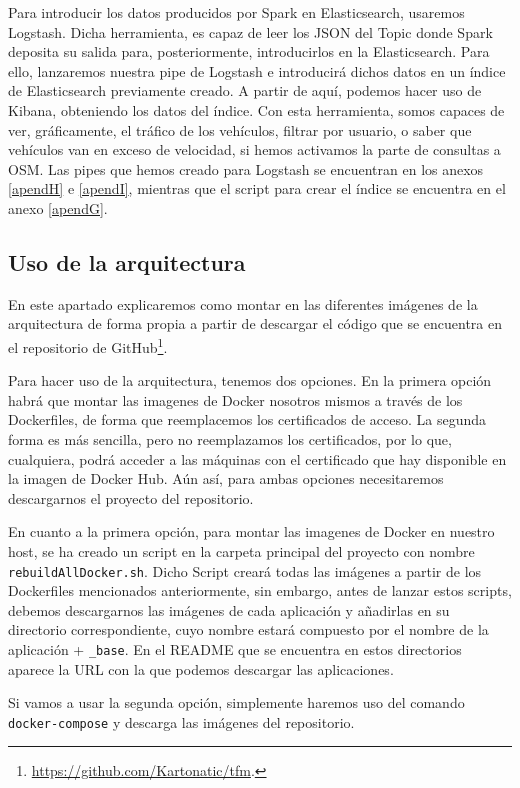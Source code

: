 Para introducir los datos producidos por Spark en Elasticsearch, usaremos Logstash. Dicha herramienta, es capaz de leer los JSON del Topic donde Spark deposita su salida para, posteriormente, introducirlos en la Elasticsearch. Para ello, lanzaremos nuestra pipe de Logstash e introducirá dichos datos en un índice de Elasticsearch previamente creado. A partir de aquí, podemos hacer uso de Kibana, obteniendo los datos del índice. Con esta herramienta, somos capaces de ver, gráficamente, el tráfico de los vehículos, filtrar por usuario, o saber que vehículos van en exceso de velocidad, si hemos activamos la parte de consultas a OSM. Las pipes que hemos creado para Logstash se encuentran en los anexos \ref{apendH} e \ref{apendI}, mientras que el script para crear el índice se encuentra en el anexo \ref{apendG}.

\subsection{Uso de la arquitectura \label{uso}}

En este apartado explicaremos como montar en las diferentes imágenes de la
arquitectura de forma propia a partir de descargar el código que se
encuentra en el repositorio de
GitHub\footnote{\url{https://github.com/Kartonatic/tfm}.}.

Para hacer uso de la arquitectura, tenemos dos opciones. En la primera opción habrá que montar las imagenes de Docker nosotros mismos a través de los Dockerfiles, de forma que reemplacemos los certificados de acceso. La segunda forma es más sencilla, pero no reemplazamos los certificados, por lo que, cualquiera, podrá acceder a las máquinas con el certificado que hay disponible en la imagen de Docker Hub. Aún así, para ambas opciones necesitaremos descargarnos el proyecto del repositorio.

En cuanto a la primera opción, para montar las imagenes de Docker en nuestro host, se ha creado un script en la carpeta principal del proyecto con nombre {\tt rebuildAllDocker.sh}. Dicho Script creará todas las imágenes a partir de los Dockerfiles mencionados anteriormente, sin embargo, antes de lanzar estos scripts, debemos descargarnos las imágenes de cada aplicación y añadirlas en su directorio correspondiente, cuyo nombre estará compuesto por el nombre de la aplicación + {\tt \_base}. En el README que se encuentra en estos directorios aparece la URL con la que podemos descargar las aplicaciones.

Si vamos a usar la segunda opción, simplemente haremos uso del comando {\tt docker-compose} y descarga las imágenes del repositorio.

